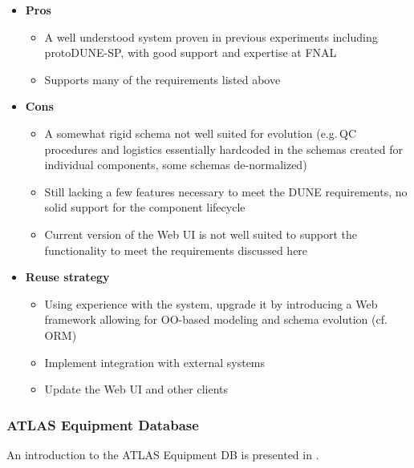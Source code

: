 \documentclass[pdftex,12pt,letter]{article}
\begin{document}
\begin{itemize}

\item \textbf{Pros}
\begin{itemize}
\item A well understood system proven in previous experiments including protoDUNE-SP, with good support and expertise at FNAL
\item Supports many of the requirements listed above
\end{itemize}

\item \textbf{Cons}
\begin{itemize}
\item A somewhat rigid schema not well suited for evolution (e.g.\,QC procedures and logistics essentially hardcoded in the schemas
created for individual components, some schemas de-normalized)
\item Still lacking a few features necessary to meet the DUNE requirements, no solid support for the component lifecycle
\item Current version of the Web UI is not well suited to support the functionality to meet the requirements discussed here
\end{itemize}

\item \textbf{Reuse strategy}
\begin{itemize}
\item Using experience with the system, upgrade it by introducing a Web framework allowing for OO-based modeling and schema evolution (cf.\,ORM)
\item Implement integration with external systems
\item Update the Web UI and other clients
\end{itemize}


\end{itemize}

\subsubsection{ATLAS Equipment Database}

An introduction to the ATLAS Equipment DB is presented in \cite{atlasequipmentdb}.
\end{document}
